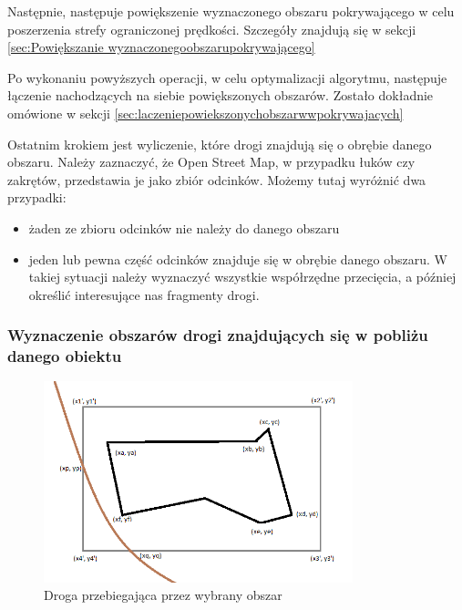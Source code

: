 Następnie, następuje powiększenie wyznaczonego obszaru pokrywającego w celu poszerzenia strefy ograniczonej prędkości. Szczegóły znajdują się w sekcji \ref{sec:Powiększanie wyznaczonegoobszarupokrywającego}

Po wykonaniu powyższych operacji, w celu optymalizacji algorytmu, następuje łączenie nachodzących na siebie powiększonych obszarów.  Zostało dokładnie omówione w sekcji \ref{sec:laczeniepowiekszonychobszarwwpokrywajacych}


Ostatnim krokiem jest wyliczenie, które drogi znajdują się o obrębie danego obszaru. Należy zaznaczyć, że Open Street Map, w przypadku łuków czy zakrętów, przedstawia je jako zbiór odcinków. Możemy tutaj wyróżnić dwa przypadki:
\begin{itemize}
\item żaden ze zbioru odcinków nie należy do danego obszaru
\item jeden lub pewna część odcinków znajduje się w obrębie danego obszaru. W takiej sytuacji należy wyznaczyć wszystkie współrzędne przecięcia, a później określić interesujące nas fragmenty drogi.
\end{itemize}




\subsubsection{Wyznaczenie obszarów drogi znajdujących się w pobliżu danego obiektu}



\newpage
\begin{figure}[h]
\caption{Droga przebiegająca przez wybrany obszar}
\label{sec:fourthBB}
\centering
\includegraphics[width=0.8\textwidth]{minBoundingBoxWay}
\end{figure}

